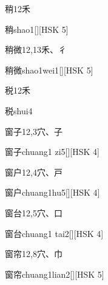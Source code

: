 \begin{entry}{稍}{12}{⽲}
  \begin{phonetics}{稍}{shao1}[][HSK 5]
  \end{phonetics}
\end{entry}

\begin{entry}{稍微}{12,13}{⽲、⼻}
  \begin{phonetics}{稍微}{shao1wei1}[][HSK 5]
  \end{phonetics}
\end{entry}

\begin{entry}{税}{12}{⽲}
  \begin{phonetics}{税}{shui4}
  \end{phonetics}
\end{entry}

\begin{entry}{窗子}{12,3}{⽳、⼦}
  \begin{phonetics}{窗子}{chuang1 zi5}[][HSK 4]
  \end{phonetics}
\end{entry}

\begin{entry}{窗户}{12,4}{⽳、⼾}
  \begin{phonetics}{窗户}{chuang1hu5}[][HSK 4]
  \end{phonetics}
\end{entry}

\begin{entry}{窗台}{12,5}{⽳、⼝}
  \begin{phonetics}{窗台}{chuang1 tai2}[][HSK 4]
  \end{phonetics}
\end{entry}

\begin{entry}{窗帘}{12,8}{⽳、⼱}
  \begin{phonetics}{窗帘}{chuang1lian2}[][HSK 5]
  \end{phonetics}
\end{entry}


